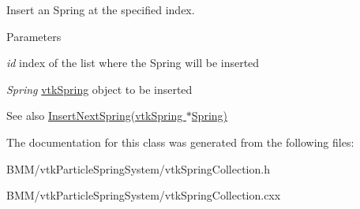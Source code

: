 Insert an Spring at the specified index. 


\begin{DoxyParams}{Parameters}
\item[{\em id}]index of the list where the Spring will be inserted \item[{\em Spring}]\hyperlink{classvtkSpring}{vtkSpring} object to be inserted \end{DoxyParams}
\begin{DoxySeeAlso}{See also}
\hyperlink{classvtkSpringCollection_a5f4f41081d180270bff00fddf137a64f}{InsertNextSpring(vtkSpring $\ast$Spring)} 
\end{DoxySeeAlso}


The documentation for this class was generated from the following files:\begin{DoxyCompactItemize}
\item 
BMM/vtkParticleSpringSystem/vtkSpringCollection.h\item 
BMM/vtkParticleSpringSystem/vtkSpringCollection.cxx\end{DoxyCompactItemize}
